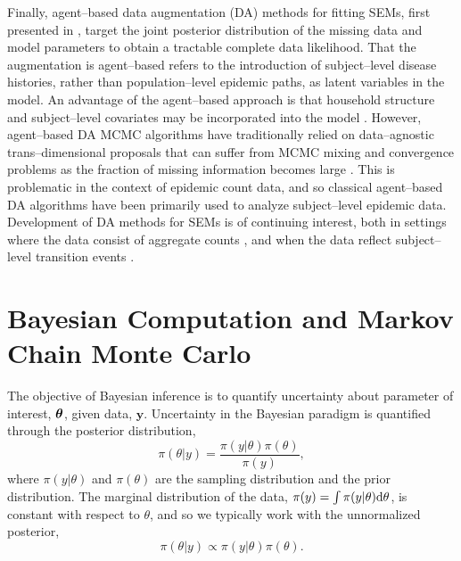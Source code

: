 Finally, agent--based data augmentation (DA) methods for fitting SEMs, first presented in \cite{gibson1998,oneill1999}, target the joint posterior distribution of the missing data and model parameters to obtain a tractable complete data likelihood. That the augmentation is agent--based refers to the introduction of subject--level disease histories, rather than population--level epidemic paths, as latent variables in the model. An advantage of the agent--based approach is that household structure and subject--level covariates may be incorporated into the model \cite{auranen2000,hohle2002,cauchemez2004bayesian, neal2004statistical,oneill2009}. However, agent--based DA MCMC algorithms have traditionally relied on data--agnostic trans--dimensional proposals that can suffer from MCMC mixing and convergence problems as the fraction of missing information becomes large \cite{roberts2001, mckinley2014simulation, pooley2015}. This is problematic in the context of epidemic count data, and so classical agent--based DA algorithms have been primarily used to analyze subject--level epidemic data. Development of DA methods for SEMs is of continuing interest, both in settings where the data consist of aggregate counts \cite{pooley2015,QinShe15,shestopaloff2016sampling}, and when the data reflect subject--level transition events \cite{kypraios2018bayesian,xu2016bayesian}.

\section{Bayesian Computation and Markov Chain Monte Carlo}
\label{sec:bayesian_computation}

The objective of Bayesian inference is to quantify uncertainty about  parameter of interest, $\boldsymbol{\theta} $, given data, $\mathbf{y}$. 
Uncertainty in the Bayesian paradigm is quantified through the posterior distribution, $$\pi(\theta|y)=\frac{\pi(y|\theta)\pi(\theta)}{\pi(y)},$$
where $ \pi(y|\theta) $ and $ \pi(\theta) $ are the sampling distribution and the prior distribution. The marginal distribution of the data, $ \pi(y) = \int\pi(y|\theta)\mathrm{d}\theta $, is constant with respect to $ \theta $, and so we typically work with the unnormalized posterior, $$ \pi(\theta|y)\propto\pi(y|\theta)\pi(\theta). $$

